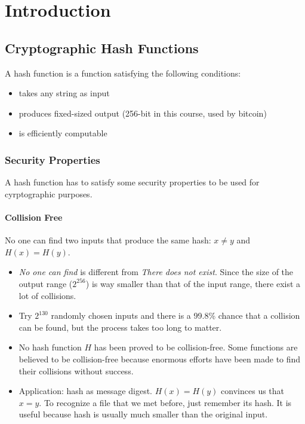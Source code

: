 \ifx\PREAMBLE\undefined


\fi
\chapter{Introduction}
\section{Cryptographic Hash Functions}
A hash function is a function satisfying the following conditions:
\begin{itemize}
  \item takes any string as input
  \item produces fixed-sized output (256-bit in this course, used by bitcoin)
  \item is efficiently computable
\end{itemize}
\subsection{Security Properties}
A hash function has to satisfy some security properties to be used for cyrptographic purposes.
\subsubsection{Collision Free}
No one can find two inputs that produce the same hash: $x\neq y$ and $H(x)=H(y)$. 
\begin{itemize}
  \item \textit{No one can find} is different from \textit{There does not exist}. Since the size of the output range ($2^{256}$) is way smaller than that of the input range, there exist a lot of collisions. 
  \item Try $2^{130}$ randomly chosen inputs and there is a 99.8\% chance that a collision can be found, but the process takes too long to matter.
  \item No hash function $H$ has been proved to be collision-free. Some functions are believed to be collision-free because enormous efforts have been made to find their collisions without success.
  \item Application: hash as message digest. $H(x)=H(y)$ convinces us that $x=y$. To recognize a file that we met before, just remember its hash. It is useful because hash is usually much smaller than the original input.
\end{itemize}
